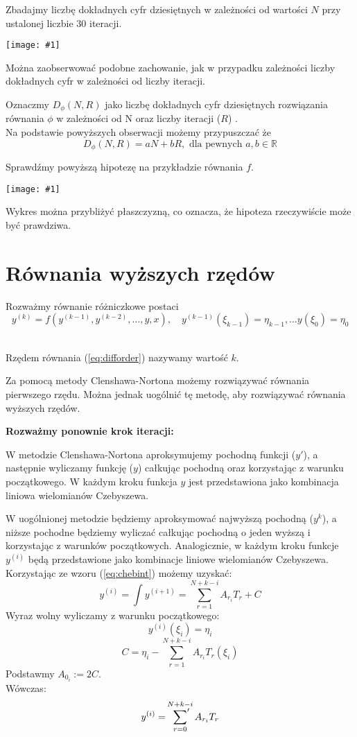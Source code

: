 \documentclass{article}
\newcommand{\plot}[1] {
	\texttt{[image: \#1]}
}
\newcommand{\sumprim}[3] {
	\sideset{}{'}\sum_{#1}^{#2} #3
}
\begin{document}
\par  Zbadajmy liczbę dokładnych cyfr dziesiętnych w zależności od wartości $N$ przy ustalonej liczbie 30 iteracji.

\plot{n.png}

Można zaobserwować podobne zachowanie, jak w przypadku zależności liczby dokładnych cyfr w zależności od liczby iteracji. 

Oznaczmy $D_{\phi}(N, R)$ jako liczbę dokładnych cyfr dziesiętnych rozwiązania równania $\phi$ w zależności od N oraz liczby iteracji ($R$) . \\
Na podstawie powyższych obserwacji możemy przypuszczać że 
$$ D_{\phi}(N, R) = aN + bR,   \text{  dla pewnych $a, b \in \mathbb{R} $}$$

Sprawdźmy powyższą hipotezę na przykładzie równania $f$.

\plot{itersn.png}

Wykres można przybliżyć płaszczyzną, co oznacza, że hipoteza rzeczywiście może być prawdziwa.

\section{Równania wyższych rzędów}

Rozważmy równanie różniczkowe postaci 
\begin{equation} 
	\label{eq:difforder}
	y^{(k)} = f(y^{(k-1)}, y^{(k-2)}, \ldots, y, x), \quad y^{(k-1)}(\xi_{k-1}) = \eta_{k-1},  \ldots y(\xi_0)= \eta_0
\end{equation}\

Rzędem równania (\ref{eq:difforder}) nazywamy wartość $k$. 

\par Za pomocą metody Clenshawa-Nortona możemy rozwiązywać równania pierwszego rzędu. Można jednak uogólnić tę metodę, aby rozwiązywać równania wyższych rzędów.

\par \textbf{Rozważmy ponownie krok iteracji:} 
	\par W metodzie Clenshawa-Nortona aproksymujemy pochodną funkcji ($y'$), a następnie wyliczamy funkcję ($y$) całkując pochodną oraz korzystając z warunku początkowego. W każdym kroku funkcja $y$ jest przedstawiona jako kombinacja liniowa wielomianów Czebyszewa.
\par W uogólnionej metodzie będziemy aproksymować najwyższą pochodną ($y^k$), a niższe pochodne będziemy wyliczać całkując pochodną o jeden wyższą i korzystając z warunków początkowych. Analogicznie, w każdym kroku funkcje $y^{(i)}$ będą przedstawione jako kombinacje liniowe wielomianów Czebyszewa.
	Korzystając ze wzoru (\ref{eq:chebint}) możemy uzyskać:
	$$ y^{(i)} = \int y^{(i+1)} = \sum_{r=1}^{N+k-i} A_{r_i} T_r  + C$$ 
	Wyraz wolny wyliczamy z warunku początkowego:
	$$ y^{(i)}(\xi_i) = \eta_i $$
	$$ C = \eta_i - \sum_{r=1}^{N+k-i} A_{r_i} T_r(\xi_i) $$
	Podstawmy $A_{0_i} := 2C$. \\
	Wówczas:
	$$ y^{(i)} =  \sumprim{r=0}{N+k-i} A_{r_i} T_r $$
	
\end{document}
